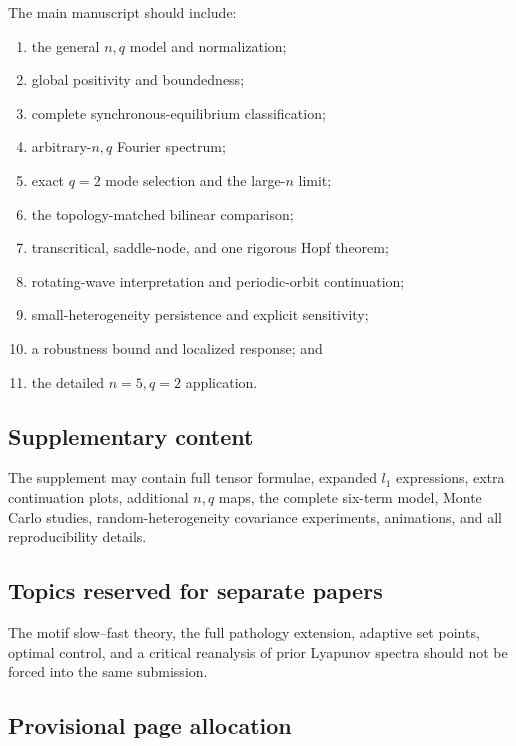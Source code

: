 \documentclass[11pt, reqno]{amsart}
\theoremstyle{definition}
\theoremstyle{remark}
\begin{document}
The main manuscript should include:
\begin{enumerate}[label=(\roman*),leftmargin=2.5em]
    \item the general $n,q$ model and normalization;
    \item global positivity and boundedness;
    \item complete synchronous-equilibrium classification;
    \item arbitrary-$n,q$ Fourier spectrum;
    \item exact $q=2$ mode selection and the large-$n$ limit;
    \item the topology-matched bilinear comparison;
    \item transcritical, saddle-node, and one rigorous Hopf theorem;
    \item rotating-wave interpretation and periodic-orbit continuation;
    \item small-heterogeneity persistence and explicit sensitivity;
    \item a robustness bound and localized response; and
    \item the detailed $n=5,q=2$ application.
\end{enumerate}

\subsection{Supplementary content}

The supplement may contain full tensor formulae, expanded $l_1$ expressions,
extra continuation plots, additional $n,q$ maps, the complete six-term model,
Monte Carlo studies, random-heterogeneity covariance experiments, animations,
and all reproducibility details.

\subsection{Topics reserved for separate papers}

The motif slow--fast theory, the full pathology extension, adaptive set points,
optimal control, and a critical reanalysis of prior Lyapunov spectra should not
be forced into the same submission.

\subsection{Provisional page allocation}
\end{document}
